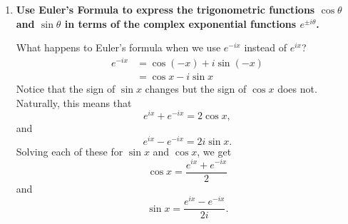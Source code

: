 \documentclass[11pt]{article}
\begin{document}
\begin{enumerate}[label=\textbf{\arabic*.}]
{\begin{enumerate}[label=\textbf{(\alph*)}]
{                    When written out like this, it is easy to see that the expansion of \(\cos x\) is extremely similar to that of \(\sin x\), but \(\cos x\) contains all the even terms, while \(\sin x\) contains all the odd terms. Another observation to make is that the expansion of \(e^x\) is astoundingly similar to \(\cos x+\sin x\):
                    \[\cos x+\sin x=1+x-\frac{x^2}{2}-\frac{x^3}{3!}+\frac{x^4}{4!}+\frac{x^5}{5!}-\frac{x^6}{6!}-\frac{x^7}{7!}+\frac{x^8}{8!}+\frac{x^9}{9!}-\ldots\]
                    The only difference is the signs on some of the terms. The pattern appears to be \(++--++--++--\ldots\), which is suspiciously similar to the signs of the powers of \(i\):
                    \[i^0=1,\ i^1=i,\ i^2=-1,\ i^3=-i,\ i^4=1,\ i^5=i,\ i^6=-1,\ \ldots\]
                    The thought comes to mind: what if instead of \(e^x\), we wrote out \(e^{ix}\) instead? Then, the \(x^n\) portion of that infinite sum would lead to the same sign pattern as in \(\cos x+\sin x\).
                    \begin{align*}
                        e^{ix}&=1+ix+\frac{(ix)^2}{2}+\frac{(ix)^3}{3!}+\frac{(ix)^4}{4!}+\frac{(ix)^5}{5!}+\frac{(ix)^6}{6!}+\frac{(ix)^7}{7!}+\frac{(ix)^8}{8!}+\frac{(ix)^9}{9!}-\ldots \\
                        &=1+ix-\frac{x^2}{2}-\frac{ix^3}{3!}+\frac{x^4}{4!}+\frac{ix^5}{5!}-\frac{x^6}{6!}-\frac{ix^7}{7!}+\frac{x^8}{8!}+\frac{ix^9}{9!}-\ldots
                    \end{align*}
                    Now the only difference between \(e^{ix}\) and \(\cos x+\sin x\) is a factor of \(i\) on the odd terms. But, as we saw earlier, the odd terms come from \(\sin x\)! If we instead write the expansion of \(\cos x+i\sin x\) (multiplying \(\sin x\) by \(i\)), we get the two expressions to exactly match. This leads us to writing the formula
                    \[e^{ix}=\cos x+i\sin x.\]
                }
                \item{
                    \textbf{\boldmath Use Euler's Formula to express the trigonometric functions \(\cos\theta\) and \(\sin\theta\) in terms of the complex exponential functions \(e^{\pm i\theta}\).}
                    \par
                    What happens to Euler's formula when we use \(e^{-ix}\) instead of \(e^{ix}\)?
                    \begin{align*}
                        e^{-ix}&=\cos(-x)+i\sin(-x) \\
                        &=\cos x-i\sin x
                    \end{align*}
                    Notice that the sign of \(\sin x\) changes but the sign of \(\cos x\) does not. Naturally, this means that \[e^{ix}+e^{-ix}=2\cos x,\] and \[e^{ix}-e^{-ix}=2i\sin x.\] Solving each of these for \(\sin x\) and \(\cos x\), we get \[\cos x=\frac{e^{ix}+e^{-ix}}{2}\] and \[\sin x=\frac{e^{ix}-e^{-ix}}{2i}.\]
                }
            \end{enumerate}
        }
    \end{enumerate}
\end{document}
